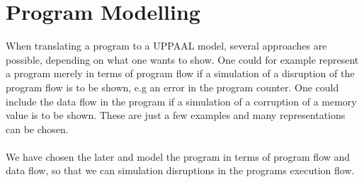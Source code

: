 \section{Program Modelling}
When translating a program to a UPPAAL model, several approaches are possible, depending on what one wants to show. One could for example represent a program merely in terms of program flow if a simulation of a disruption of the program flow is to be shown, e.g an error in the program counter. One could include the data flow in the program if a simulation of a corruption of a memory value is to be shown. These are just a few examples and many representations can be chosen.\\\\

We have chosen the later and model the program in terms of program flow and data flow, so that we can simulation disruptions in the programs execution flow. 




